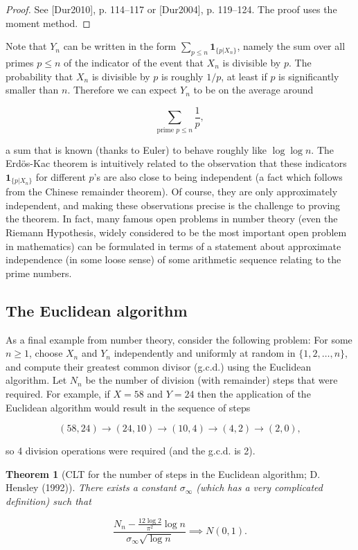 \documentclass[11pt]{report}
\theoremstyle{plain}
\newtheorem{thm}{Theorem}[chapter]
\theoremstyle{definition}
\begin{document}
\begin{proof}
See [Dur2010], p. 114--117 or [Dur2004], p. 119--124.
The proof uses the moment method.
\end{proof}

Note that $Y_n$ can be written in the form
$\sum_{p\le n} \mathbf{1}_{\{p | X_n\}}$, namely the
sum over all primes $p\le n$ of the indicator of the
event that $X_n$ is divisible by $p$. The probability
that $X_n$ is divisible by $p$ is roughly $1/p$, at
least if $p$ is significantly smaller than $n$.
Therefore we can expect $Y_n$  to be on the average
around

\[
\sum_{\textrm{prime }p\le n} \frac{1}{p},
\]

a sum that is known (thanks to Euler) to behave
roughly like $\log\log n$. The Erdös-Kac theorem is
intuitively related to the observation that these
indicators $\mathbf{1}_{\{p | X_n\}}$ for different
$p$'s are also close to being independent (a fact
which follows from the Chinese remainder theorem). Of
course, they are only approximately independent, and
making these observations precise is the challenge to
proving the theorem. In fact, many famous open
problems in number theory (even the Riemann
Hypothesis, widely considered to be the most important
open problem in mathematics) can be formulated in
terms of a statement about approximate independence
(in some loose sense) of some arithmetic sequence
relating to the prime numbers.

\subsection{The Euclidean algorithm}
As a final example from number theory, consider the
following problem: For some $n\ge 1$, choose $X_n$
and $Y_n$ independently and uniformly at random in
$\{1,2,\ldots,n\}$, and compute their greatest common
divisor (g.c.d.) using the Euclidean algorithm. Let
$N_n$ be the number of division (with remainder)
steps that were required. For example, if $X = 58$
and $Y=24$ then the application of the Euclidean
algorithm would result in the sequence of steps

\[
(58,24) \to (24,10) \to (10,4) \to (4,2) \to (2,0),
\]

so 4 division operations were required (and the
g.c.d. is 2).

\begin{thm}[CLT for the number of steps in the Euclidean algorithm; D. Hensley (1992)]
There exists a constant $\sigma_\infty$ (which has a
very complicated definition) such that

\[
\frac{N_n - \frac{12 \log 2}{\pi^2} \log n}{\sigma_\infty \sqrt{\log n}} \implies N(0,1).
\]

\end{thm}
\end{document}
